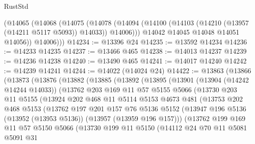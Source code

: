 \begin{lexlean}{RustStd}
\begin{coremodule}
        (@14065
          (@14068
            (@14075
              (@14078
                (@14094 (@14100 (@14103 (@14210 (@13957 (@14211 @5117 @5093)) @14033)) @14006)))
              @14042
              @14045
              @14048
              @14051
              @14056))
          @14006)))
@14234 := @13396 @24
@14235 := @13592 @14234
@14236 := @14233 @14235
@14237 := @13466 @465
@14238 := @14013 @14237
@14239 := @14236 @14238
@14240 := @13490 @465
@14241 := @14017 @14240
@14242 := @14239 @14241
@14244 := @14022 (@14024 @24)
@14422 := @13863
    (@13866
      (@13873
        (@13876
          (@13882
            (@13885
              (@13892
                (@13895
                  (@13901
                    (@13904 (@14242 @14244 @14033))
                    (@13762
                      @203
                      @169
                      @11
                      @57
                      @5155
                      @5066
                      (@13730
                        @203
                        @11
                        @5155
                        (@13924
                          @202
                          @468
                          @11
                          @5114
                          @5153
                          @4673
                          @481
                          (@13753
                            @202
                            @468
                            @5153
                            (@13762
                              @197
                              @201
                              @157
                              @76
                              @5136
                              @5152
                              (@13947
                                @196
                                @5136
                                (@13952 (@13953 @5136))
                                (@13957 (@13959 @196 @157)))
                              (@13762
                                @199
                                @169
                                @11
                                @57
                                @5150
                                @5066
                                (@13730
                                  @199
                                  @11
                                  @5150
                                  (@14112
                                    @24
                                    @70
                                    @11
                                    @5081
                                    @5091
                                    @31

\end{coremodule}
\end{lexlean}
